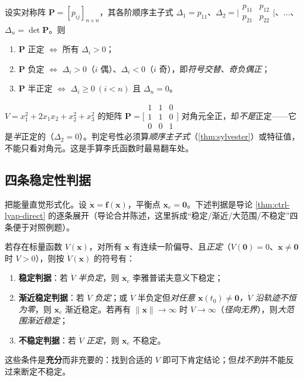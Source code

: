 \begin{theorem}[希尔维斯特判据]\label{thm:sylvester}
设实对称阵 $\mathbf{P}=[p_{ij}]_{n\times n}$，其各阶顺序主子式 $\Delta_1=p_{11}$、$\Delta_2=\big|\begin{smallmatrix}p_{11}&p_{12}\\p_{21}&p_{22}\end{smallmatrix}\big|$、$\dots$、$\Delta_n=\det\mathbf{P}$。则
\begin{enumerate}
  \item $\mathbf{P}$ 正定 $\iff$ 所有 $\Delta_i>0$；
  \item $\mathbf{P}$ 负定 $\iff$ $\Delta_i>0$（$i$ 偶）、$\Delta_i<0$（$i$ 奇），即\emph{符号交替、奇负偶正}；
  \item $\mathbf{P}$ 半正定 $\iff$ $\Delta_i\ge0\ (i<n)$ 且 $\Delta_n=0$。
\end{enumerate}
\end{theorem}

\begin{pitfall}
$V=x_1^2+2x_1x_2+x_2^2+x_3^2$ 的矩阵 $\mathbf{P}=\big[\begin{smallmatrix}1&1&0\\1&1&0\\0&0&1\end{smallmatrix}\big]$ 对角元全正，却\emph{不是}正定——它是\emph{半}正定的（$\Delta_2=0$）。判定号性必须算\emph{顺序主子式}（\cref{thm:sylvester}）或特征值，不能只看对角元。这是手算李氏函数时最易翻车处。
\end{pitfall}

\subsection{四条稳定性判据}
\label{sec:lyap-criteria}

把能量直觉形式化。设 $\dot{\mathbf{x}}=\mathbf{f}(\mathbf{x})$，平衡点 $\mathbf{x}_e=\mathbf{0}$。下述判据是导论 \cref{thm:ctrl-lyap-direct} 的逐条展开（导论合并陈述，这里拆成“稳定/渐近/大范围/不稳定”四条便于对照例题）。

\begin{theorem}[李雅普诺夫第二法的四条判据]\label{thm:lyap-criteria}
若存在标量函数 $V(\mathbf{x})$，对所有 $\mathbf{x}$ 有连续一阶偏导、且\emph{正定}（$V(\mathbf{0})=0$、$\mathbf{x}\neq\mathbf{0}$ 时 $V>0$），则按 $\dot V(\mathbf{x})$ 的符号有：
\begin{enumerate}
  \item \textbf{稳定判据}：若 $\dot V$ \emph{半负定}，则 $\mathbf{x}_e$ 李雅普诺夫意义下稳定；
  \item \textbf{渐近稳定判据}：若 $\dot V$ \emph{负定}；或 $\dot V$ 半负定但\emph{对任意 $\mathbf{x}(t_0)\neq\mathbf{0}$，$\dot V$ 沿轨迹不恒为零}，则 $\mathbf{x}_e$ 渐近稳定。若再有 $\|\mathbf{x}\|\to\infty$ 时 $V\to\infty$（\emph{径向无界}），则\emph{大范围渐近稳定}；
  \item \textbf{不稳定判据}：若 $\dot V$ \emph{正定}，则 $\mathbf{x}_e$ 不稳定。
\end{enumerate}
这些条件是\textbf{充分}而非充要的：找到合适的 $V$ 即可下肯定结论；但\emph{找不到}并不能反过来断定不稳定。
\end{theorem}

